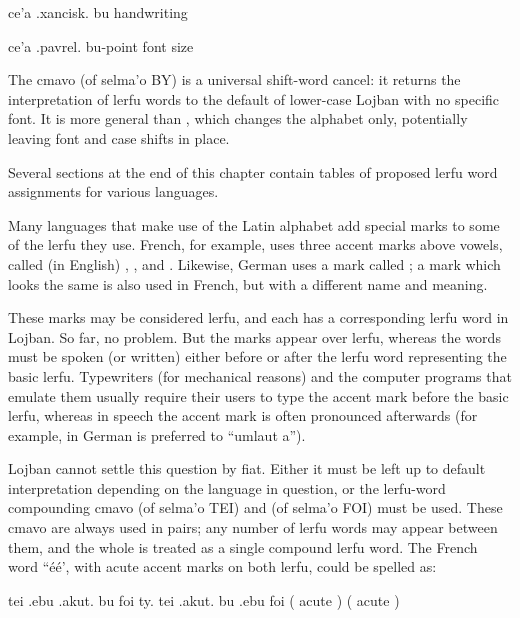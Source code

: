 \begin{example}
ce'a .xancisk. bu\n
handwriting
\end{example}

\begin{example}
ce'a .pavrel. bu-point font size
\end{example}

The cmavo  (of selma'o BY) is a universal shift-word
    cancel: it returns the interpretation of lerfu words to the
    default of lower-case Lojban with no specific font. It is more
    general than , which changes the alphabet only,
    potentially leaving font and case shifts in place. 

Several sections at the end of this chapter contain tables
    of proposed lerfu word assignments for various languages.



Many languages that make use of the Latin alphabet add
    special marks to some of the lerfu they use. French, for
    example, uses three accent marks above vowels, called (in
    English) , , and . Likewise,
    German uses a mark called ; a mark which looks the
    same is also used in French, but with a different name and
    meaning.

These marks may be considered lerfu, and each has a
    corresponding lerfu word in Lojban. So far, no problem. But the
    marks appear over lerfu, whereas the words must be spoken (or
    written) either before or after the lerfu word representing the
    basic lerfu. Typewriters (for mechanical reasons) and the
    computer programs that emulate them usually require their users
    to type the accent mark before the basic lerfu, whereas in
    speech the accent mark is often pronounced afterwards (for
    example, in German  is preferred to ``umlaut
    a'').

 Lojban cannot settle this question by fiat. Either it must be
    left up to default interpretation depending on the language in
    question, or the lerfu-word compounding cmavo  (of selma'o
    TEI) and  (of selma'o FOI) must be used. These cmavo are
    always used in pairs; any number of lerfu words may appear between
    them, and the whole is treated as a single compound lerfu word. The
    French word ``\'{e}\'{e}', with acute accent marks on both
     lerfu, could be spelled as:
\begin{example}
tei .ebu .akut. bu foi ty. tei .akut. bu .ebu foi\n
(  acute )  ( acute  )
\end{example}

